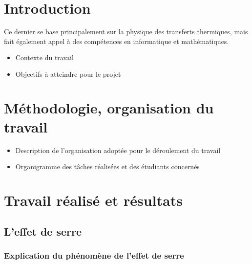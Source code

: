 \documentclass[a4paper, 12pt]{report} %
\begin{document}

\newpage
\chapter*{Introduction}				

Ce dernier se base principalement 
sur la physique des transferts thermiques, mais fait également
appel à des compétences en informatique et mathématiques. 
\begin{itemize}
\item Contexte du travail
	  
\item Objectifs à atteindre pour le projet
\end{itemize}


\chapter{Méthodologie, organisation du travail}

\begin{itemize}
\item Description de l'organisation adoptée pour le déroulement du travail
\item Organigramme des tâches réalisées et des étudiants concernés
\end{itemize}


\chapter{Travail réalisé et résultats}

\section{L'effet de serre}

\subsection{Explication du phénomène de l'effet de serre}
\end{document}
